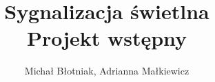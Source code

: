 \documentclass[a4paper]{article}
\title{
Sygnalizacja świetlna
\\ Projekt wstępny
}
\date{}
\author{Michał Błotniak, Adrianna Małkiewicz}
\begin{document}
\RaggedRight

\maketitle

\section{}
\subsection{}
\end{document}
